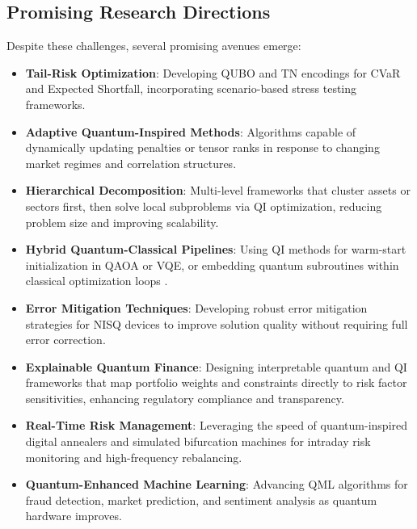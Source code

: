 \documentclass[12pt]{article}
\numberwithin{equation}{section}
\begin{document}
\subsection{Promising Research Directions}

Despite these challenges, several promising avenues emerge:

\begin{itemize}[leftmargin=*]
\item \textbf{Tail-Risk Optimization}: Developing QUBO and TN encodings for CVaR and Expected Shortfall, incorporating scenario-based stress testing frameworks.

\item \textbf{Adaptive Quantum-Inspired Methods}: Algorithms capable of dynamically updating penalties or tensor ranks in response to changing market regimes and correlation structures.

\item \textbf{Hierarchical Decomposition}: Multi-level frameworks that cluster assets or sectors first, then solve local subproblems via QI optimization, reducing problem size and improving scalability.

\item \textbf{Hybrid Quantum-Classical Pipelines}: Using QI methods for warm-start initialization in QAOA or VQE, or embedding quantum subroutines within classical optimization loops \citep{Rebentrost2018QuantumFinance}.

\item \textbf{Error Mitigation Techniques}: Developing robust error mitigation strategies for NISQ devices to improve solution quality without requiring full error correction.

\item \textbf{Explainable Quantum Finance}: Designing interpretable quantum and QI frameworks that map portfolio weights and constraints directly to risk factor sensitivities, enhancing regulatory compliance and transparency.

\item \textbf{Real-Time Risk Management}: Leveraging the speed of quantum-inspired digital annealers and simulated bifurcation machines for intraday risk monitoring and high-frequency rebalancing.

\item \textbf{Quantum-Enhanced Machine Learning}: Advancing QML algorithms for fraud detection, market prediction, and sentiment analysis as quantum hardware improves.
\end{itemize}
\end{document}
